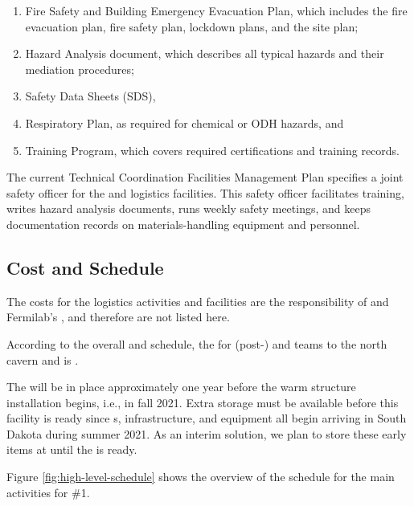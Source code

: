 \begin{enumerate}
\item	Fire Safety and Building Emergency Evacuation Plan, which includes the fire evacuation plan, fire safety plan,  lockdown plans, and the site plan;
\item	Hazard Analysis document, which describes all typical hazards and their mediation %
procedures; 
\item	%
Safety Data Sheets (SDS), 
\item	Respiratory Plan, as required for chemical or ODH hazards, and 
\item	Training Program, which covers required certifications and  training records.
\end{enumerate}

The current Technical Coordination Facilities Management Plan  specifies a joint safety officer for %
the  and logistics facilities. This safety officer facilitates training, writes hazard analysis documents, runs weekly safety meetings, and keeps documentation records on materials-handling equipment and personnel. 




\subsection{Cost and Schedule} %
\label{sec:fdsp-tc-log-cost}

The costs for the logistics activities and facilities are the responsibility of  and Fermilab's , and therefore are not listed here. %

According to the overall  and  schedule, the  for  (post-) and  teams to the north cavern and  is \cucbenocc{}.

The   will be in place approximately one year before the warm structure installation begins, i.e., in fall 2021.  Extra storage must be available before  this facility is ready  since  s,  infrastructure, and equipment all begin arriving in South Dakota during summer 2021.  As an interim solution, we plan to store these early items at  until the  is ready.

Figure \ref{fig:high-level-schedule} shows the overview of the schedule for the main activities for  \#1. 



